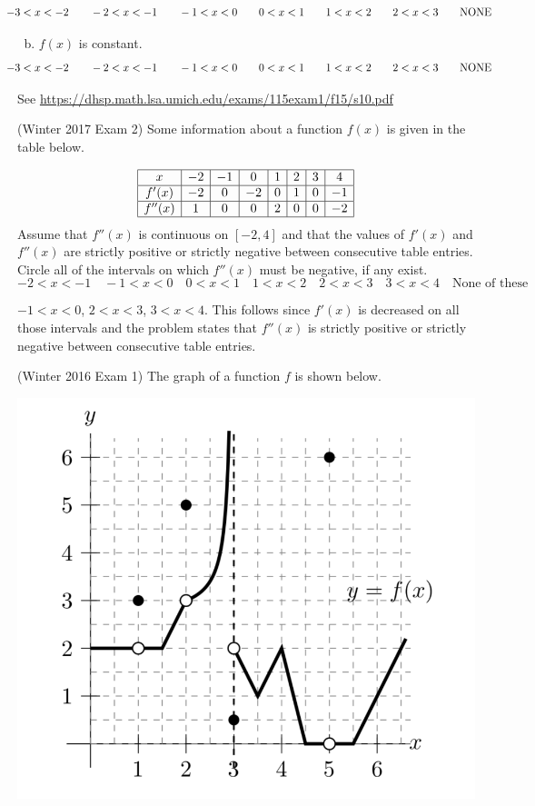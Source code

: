 \documentclass[11pt]{exam}
\begin{document}
\begin{questions}
\begin{enumerate}[(a)]
\[\hspace{-8ex}-3<x<-2 \qquad -2<x<-1 \qquad -1<x<0 \qquad 0<x<1 \qquad 1<x<2 \qquad 2<x<3 \qquad \text{NONE}\]
	\item $f(x)$ is constant.
\[\hspace{-8ex}-3<x<-2 \qquad -2<x<-1 \qquad -1<x<0 \qquad 0<x<1 \qquad 1<x<2 \qquad 2<x<3 \qquad \text{NONE}\]
\end{enumerate}
\begin{solution}
  See \href{https://dhsp.math.lsa.umich.edu/exams/115exam1/f15/s10.pdf}{https://dhsp.math.lsa.umich.edu/exams/115exam1/f15/s10.pdf}
\end{solution}
\question (Winter 2017 Exam 2) 	Some information about a function $f(x)$ is given in the table below.
	
$$\begin{array}{|c|c|c|c|c|c|c|c|}
\hline
	x &
-2 &
-1 &
0 &
1 &
2 &
3 &
4 \\
\hline
f'(x) &
-2 &
0 &
-2 &
0 &
1 &
0 &
-1 \\
\hline
f''(x) &
1 &
0 &
0 &
2 &
0 &
0 &
-2 \\
\hline
\end{array}$$
Assume that $f''(x)$ is continuous on $[-2,4]$ and that the values of $f'(x)$ and $f''(x)$ are strictly positive or strictly negative between consecutive table entries. Circle all of the intervals on which $f''(x)$ must be negative, if any exist.
$$-2 < x < -1 \quad -1 < x < 0 \quad 0 < x < 1 \quad 1 < x < 2
\quad 2<x<3 \quad 3<x<4 \quad \textrm{None of these}$$
\begin{solution}
  \(-1<x<0\), \(2<x<3\), \(3<x<4\). This follows since \(f'(x)\)
  is
  decreased on all those intervals and the problem states that
  \(f''(x)\) is strictly positive or strictly negative between
  consecutive table entries.
\end{solution}
\question (Winter 2016 Exam 1) 	The graph of a function $f$ is shown below.
  \begin{center}
    \includegraphics[scale=0.6]{Figures/discontinuities.png}
  \end{center}


\end{questions}
\end{document}
